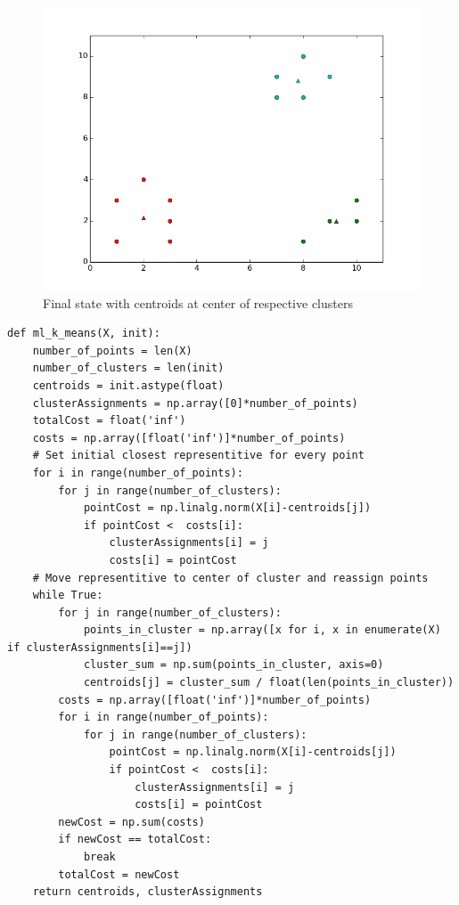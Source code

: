 \documentclass{article}
\begin{document}
\begin{enumerate}
\begin{figure}[!htb]
	\endminipage\hfill
	  \includegraphics[width=\linewidth]{../images/Cluster3.png}
	  \caption{Final state with centroids at center of respective clusters}
	\endminipage\hfill
	\end{figure}

\newpage 

\begin{lstlisting}   
def ml_k_means(X, init):
    number_of_points = len(X)
    number_of_clusters = len(init)
    centroids = init.astype(float)
    clusterAssignments = np.array([0]*number_of_points)
    totalCost = float('inf')
    costs = np.array([float('inf')]*number_of_points)
    # Set initial closest representitive for every point
    for i in range(number_of_points):
        for j in range(number_of_clusters):
            pointCost = np.linalg.norm(X[i]-centroids[j])
            if pointCost <  costs[i]:
                clusterAssignments[i] = j
                costs[i] = pointCost 
    # Move representitive to center of cluster and reassign points
    while True:                            
        for j in range(number_of_clusters):
            points_in_cluster = np.array([x for i, x in enumerate(X) if clusterAssignments[i]==j])
            cluster_sum = np.sum(points_in_cluster, axis=0)
            centroids[j] = cluster_sum / float(len(points_in_cluster))
        costs = np.array([float('inf')]*number_of_points)
        for i in range(number_of_points):
            for j in range(number_of_clusters):
                pointCost = np.linalg.norm(X[i]-centroids[j])
                if pointCost <  costs[i]:
                    clusterAssignments[i] = j
                    costs[i] = pointCost                 
        newCost = np.sum(costs)
        if newCost == totalCost:
            break
        totalCost = newCost       
    return centroids, clusterAssignments
\end{lstlisting}


\end{enumerate}
\end{document}
